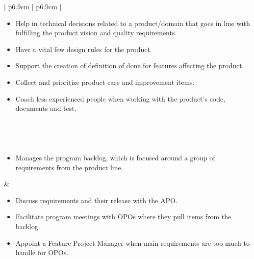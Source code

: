 \begin{table}[h]
\begin{tabularx}{\textwidth}{ | p{6.9cm} | p{6.9cm} | }
   \begin{itemize}[label={}, leftmargin=*, topsep=0pt, itemsep=0pt, partopsep=0pt]
     \item Help in technical decisions related to a product/domain that goes in line with fulfilling the product vision and quality requirements.
     \item Have a vital few design rules for the product.
     \item Support the creation of definition of done for features affecting the product.
     \item Collect and prioritize product care and improvement items.
     \item Coach less experienced people when working with the product's code, documents and test.
   \end{itemize} 
   
   \\ \hline
   
   \hline
   
   
   \\ \hline
   
   \begin{itemize}[label={}, leftmargin=*, topsep=0pt, itemsep=0pt, partopsep=0pt]
     \item Manages the program backlog, which is focused around a group of requirements from the product line.
   \end{itemize} & 
   
   \begin{itemize}[label={}, leftmargin=*, topsep=0pt, itemsep=0pt, partopsep=0pt]
     \item Discuss requirements and their release with the \ac{APO}.
     \item Facilitate program meetings with \acp{OPO} where they pull items from the backlog.
     \item Appoint a Feature Project Manager when main requirements are too much to handle for \acp{OPO}.
   \end{itemize} 
   
   \\ \hline

   \end{tabularx}
\end{table}


